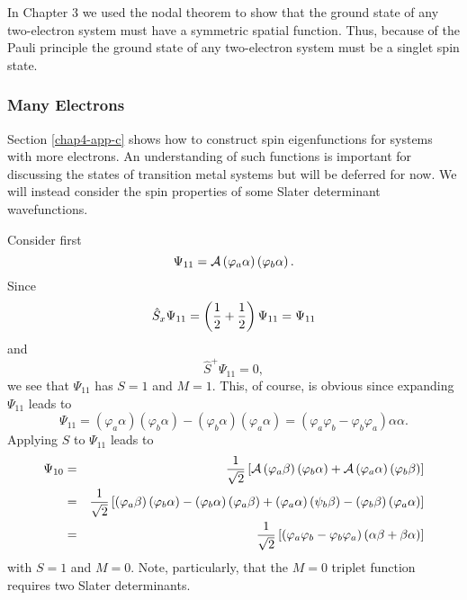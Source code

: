 In Chapter 3 we used the nodal theorem to show that the ground state of any 
two-electron system must have a symmetric spatial function.  Thus, because 
of the Pauli principle the ground state of any two-electron system must be 
a singlet spin state.

\subsubsection{Many Electrons}

Section \ref{chap4-app-c} shows how to construct spin eigenfunctions
for systems with more electrons.  An understanding of such functions
is important for discussing the states of transition metal systems but
will be deferred for now.  We will instead consider the spin
properties of some Slater determinant wavefunctions.

Consider first
\begin{equation}
\Psi_{11} = {\cal A} \left( \varphi_a \alpha \right) \left( \varphi_b \alpha 
\right).
\label{chap4-eqno28}
\end{equation}
Since
\begin{equation}
\hat{S}_x \Psi_{11} = \left( {1 \over 2} + {1 \over 2} \right) \Psi_{11} = 
\Psi_{11}
\end{equation}
and
\begin{equation}
\hat{S}^+ \Psi_{11} = 0 ,
\end{equation}
we see that $\Psi_{11}$ has $S = 1$ and $M = 1$.  This, of course, is 
obvious since expanding $\Psi_{11}$ leads to
\begin{equation}
\Psi_{11} = \left( \varphi_a \alpha \right) \left( \varphi_b \alpha \right) - 
\left( \varphi_b \alpha \right) \left( \varphi_a \alpha \right) = \left( 
\varphi_a \varphi_b - \varphi_b \varphi_a \right) \alpha \alpha .
\label{chap4-eqno29}
\end{equation}
Applying $\hat{S}$ to $\Psi_{11}$ leads to
\begin{eqnarray}
\Psi_{10} &=& {1 \over \sqrt{2}} \left[ {\cal A} \left( \varphi_a \beta 
\right) \left( \varphi_b \alpha \right) + {\cal A} \left( \varphi_a \alpha 
\right) \left( \varphi_b \beta \right) \right]\cr
&=& {1 \over \sqrt{2}} \left[ \left( \varphi_a \beta \right) \left( \varphi_b 
\alpha \right) - \left( \varphi_b \alpha \right) \left( \varphi_a \beta 
\right) + \left( \varphi_a \alpha \right) \left( \psi_b \beta \right) - 
\left( \varphi_b \beta \right) \left( \varphi_a \alpha \right) \right]\cr
&=& {1 \over \sqrt{2}} \left[ \left( \varphi_a \varphi_b - \varphi_b \varphi_a \right) 
\left( \alpha \beta + \beta \alpha \right) \right]
\end{eqnarray}
with $S = 1$ and $M = 0$.  Note, particularly, that the $M = 0$ triplet 
function requires two Slater determinants.

